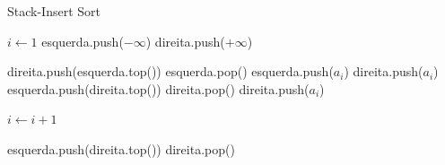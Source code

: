 \begin{algorithm}
\caption{Stack-Insert Sort}
\begin{algorithmic}

\State $i \gets 1$
\State esquerda.push($-\infty$)
\State direita.push($+\infty$)

    
    \State direita.push(esquerda.top())
    \State esquerda.pop()
    \EndWhile
    \State esquerda.push($a_i$)
    \Else
        \State direita.push($a_i$)
        \Else
            \State esquerda.push(direita.top())
            \State direita.pop()
            \EndWhile
            \State direita.push($a_i$)
        \EndIf
    \EndIf
    
    
    \State $i \gets i + 1$
    
\EndWhile

\State esquerda.push(direita.top())
\State direita.pop()
\EndWhile 
\end{algorithmic}
\end{algorithm}

